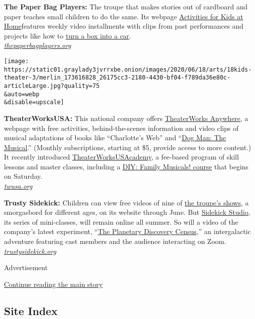 \textbf{The Paper Bag Players:} The troupe that makes stories out of
cardboard and paper teaches small children to do the same. Its webpage
\href{https://thepaperbagplayers.org/activities-for-kids-at-home/}{Activities
for Kids at Home}features weekly video installments with clips from past
performances and projects like how to
\href{https://www.youtube.com/watch?time_continue=34\&v=yR1Q1pVj6pc\&feature=emb_title}{turn
a box into a car}.\\
\href{https://thepaperbagplayers.org/}{\emph{thepaperbagplayers.org}}

\texttt{[image: https://static01.graylady3jvrrxbe.onion/images/2020/06/18/arts/18kids-theater-3/merlin\_173616828\_26175cc3-2180-4430-bf04-f789da36e80c-articleLarge.jpg?quality=75\\\&auto=webp\\\&disable=upscale]}

\textbf{TheaterWorksUSA:} This national company offers
\href{https://twusa.org/shows-artists/on-tour/anywhere/}{TheaterWorks
Anywhere}, a webpage with free activities, behind-the-scenes information
and video clips of musical adaptations of books like ``Charlotte's Web''
and
``\href{https://www.nytimes3xbfgragh.onion/2019/07/09/theater/review-dog-man-the-musical.html}{Dog
Man: The Musical}.'' (Monthly subscriptions, starting at \$5, provide
access to more content.) It recently introduced
\href{https://twusa.org/academy/}{TheaterWorksUSAcademy}, a fee-based
program of skill lessons and master classes, including a
\href{https://twusa.org/academy/diy-family-musicals/}{DIY: Family
Musicals! course} that begins on Saturday.\\
\href{https://twusa.org/}{\emph{twusa.org}}

\textbf{Trusty Sidekick:} Children can view free videos of nine of
\href{https://www.trustysidekick.org/the-shows}{the troupe's shows}, a
smorgasbord for different ages, on its website through June. But
\href{https://www.trustysidekick.org/studio}{Sidekick Studio}, its
series of mini-classes, will remain online all summer. So will a video
of the company's latest experiment,
``\href{https://www.trustysidekick.org/planetarycensus-view}{The
Planetary Discovery Census},'' an intergalactic adventure featuring cast
members and the audience interacting on Zoom.\\
\href{https://www.trustysidekick.org/}{\emph{trustysidekick.org}}

Advertisement

\protect\hyperlink{after-bottom}{Continue reading the main story}

\hypertarget{site-index}{%
\subsection{Site Index}\label{site-index}}


